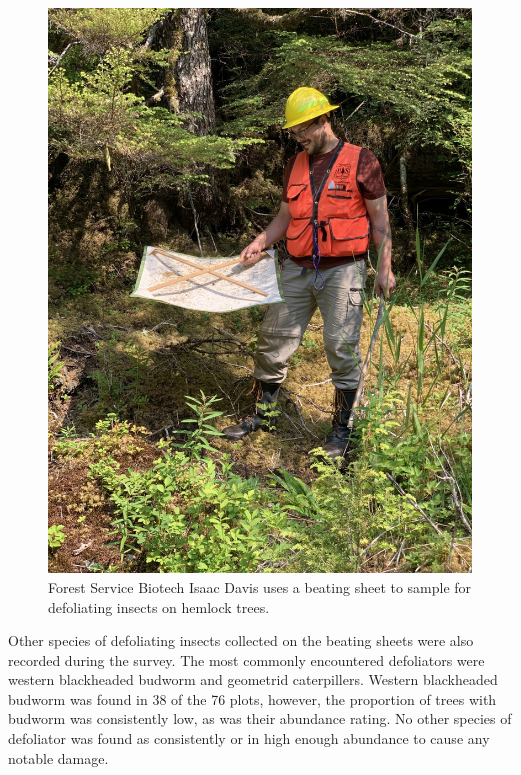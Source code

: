 \begin{multicols}{2}
\begin{figure}[H]
\begin{center}
\vspace{2mm}
\includegraphics[width=\textwidth]{img/beating_sheet.jpg}
\caption{Forest Service Biotech Isaac Davis uses a beating sheet to sample for defoliating insects on hemlock trees.}
\label{beating_sheet}
\end{center}
\end{figure} 

Other species of defoliating insects collected on the beating sheets were also recorded during the survey.  The most commonly encountered defoliators were western blackheaded budworm and geometrid caterpillers.  Western blackheaded budworm was found in 38 of the 76 plots, however, the proportion of trees with budworm was consistently low, as was their abundance rating.  No other species of defoliator was found as consistently or in high enough abundance to cause any notable damage. 
 

\end{multicols}
